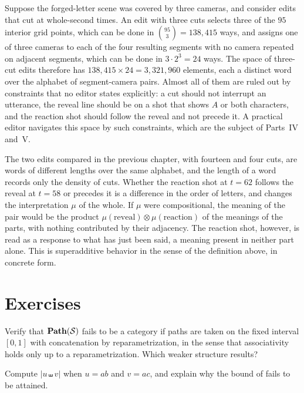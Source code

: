 Suppose the forged-letter scene was covered by three cameras, and consider edits that cut at whole-second times. An edit with three cuts selects three of the $95$ interior grid points, which can be done in $\binom{95}{3}=138{,}415$ ways, and assigns one of three cameras to each of the four resulting segments with no camera repeated on adjacent segments, which can be done in $3\cdot2^3=24$ ways. The space of three-cut edits therefore has $138{,}415\times24=3{,}321{,}960$ elements, each a distinct word over the alphabet of segment-camera pairs. Almost all of them are ruled out by constraints that no editor states explicitly: a cut should not interrupt an utterance, the reveal line should be on a shot that shows $A$ or both characters, and the reaction shot should follow the reveal and not precede it. A practical editor navigates this space by such constraints, which are the subject of Parts~IV and~V.

The two edits compared in the previous chapter, with fourteen and four cuts, are words of different lengths over the same alphabet, and the length of a word records only the density of cuts. Whether the reaction shot at $t=62$ follows the reveal at $t=58$ or precedes it is a difference in the order of letters, and changes the interpretation $\mu$ of the whole. If $\mu$ were compositional, the meaning of the pair would be the product $\mu(\text{reveal})\otimes\mu(\text{reaction})$ of the meanings of the parts, with nothing contributed by their adjacency. The reaction shot, however, is read as a response to what has just been said, a meaning present in neither part alone. This is superadditive behavior in the sense of the definition above, in concrete form.

\section*{Exercises}

\begin{exercise}
Verify that $\mathbf{Path}(\mathcal{S})$ fails to be a category if paths are taken on the fixed interval $[0,1]$ with concatenation by reparametrization, in the sense that associativity holds only up to a reparametrization. Which weaker structure results?
\end{exercise}

\begin{exercise}
Compute $\lvert u\shuffle v\rvert$ when $u=ab$ and $v=ac$, and explain why the bound of  fails to be attained.
\end{exercise}

